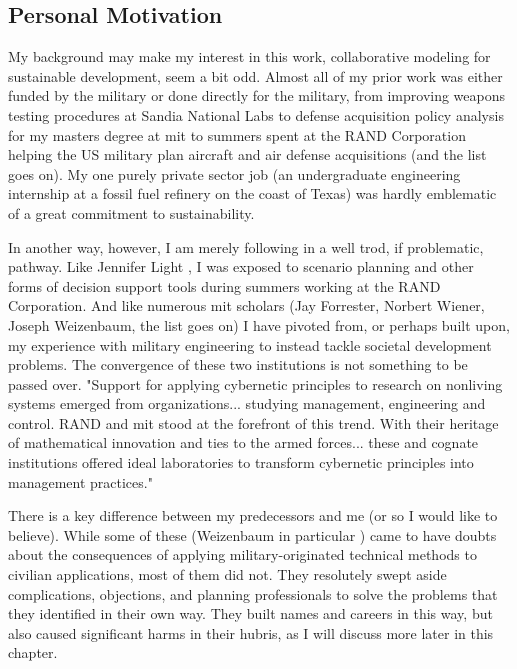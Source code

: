 \subsection{Personal Motivation}

My background may make my interest in this work, collaborative modeling for sustainable development, seem a bit odd. Almost all of my prior work was either funded by the military or done directly for the military, from improving weapons testing procedures at Sandia National Labs to defense acquisition policy analysis for my masters degree at \ac{mit} to summers spent at the RAND Corporation helping the US military plan aircraft and air defense acquisitions (and the list goes on). My one purely private sector job (an undergraduate engineering internship at a fossil fuel refinery on the coast of Texas) was hardly emblematic of a great commitment to sustainability.

In another way, however, I am merely following in a well trod, if problematic, pathway. Like Jennifer Light \cite{lightWarfareWelfareDefense2005}, I was exposed to scenario planning and other forms of decision support tools during summers working at the RAND Corporation. And like numerous \ac{mit} scholars (Jay Forrester, Norbert Wiener, Joseph Weizenbaum, the list goes on) I have pivoted from, or perhaps built upon, my experience with military engineering to instead tackle societal development problems. The convergence of these two institutions is not something to be passed over. "Support for applying cybernetic principles to research on nonliving systems emerged from organizations... studying management, engineering and control. RAND and \ac{mit} stood at the forefront of this trend. With their heritage of mathematical innovation and ties to the armed forces... these and cognate institutions offered ideal laboratories to transform cybernetic principles into management practices." \cite{lightWarfareWelfareDefense2005} 

There is a key difference between my predecessors and me (or so I would like to believe). While some of these  (Weizenbaum in particular \cite{lightWarfareWelfareDefense2005}) came to have doubts about the consequences of applying military-originated technical methods to civilian applications, most of them did not. They resolutely swept aside complications, objections, and planning professionals to solve the problems that they identified in their own way. They built names and careers in this way, but also caused significant harms in their hubris, as I will discuss more later in this chapter.

